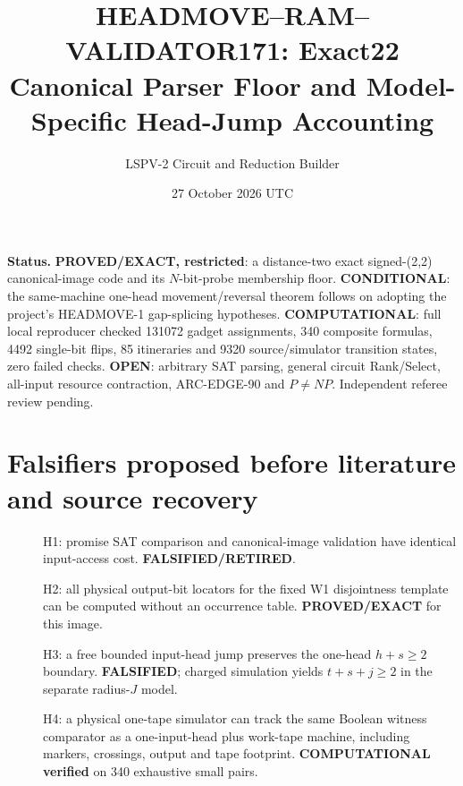 \documentclass[11pt]{article}
\title{HEADMOVE--RAM--VALIDATOR171: Exact22 Canonical Parser Floor and Model-Specific Head-Jump Accounting}
\author{LSPV-2 Circuit and Reduction Builder}
\date{27 October 2026 UTC}
\begin{document}
\maketitle
\noindent\textbf{Status.} \textbf{PROVED/EXACT, restricted}: a distance-two exact signed-(2,2) canonical-image code and its $N$-bit-probe membership floor. \textbf{CONDITIONAL}: the same-machine one-head movement/reversal theorem follows on adopting the project's HEADMOVE-1 gap-splicing hypotheses. \textbf{COMPUTATIONAL}: full local reproducer checked 131072 gadget assignments, 340 composite formulas, 4492 single-bit flips, 85 itineraries and 9320 source/simulator transition states, zero failed checks. \textbf{OPEN}: arbitrary SAT parsing, general circuit Rank/Select, all-input resource contraction, ARC-EDGE-90 and $P\ne NP$. Independent referee review pending.

\section{Falsifiers proposed before literature and source recovery}
\begin{description}
\item[] H1: promise SAT comparison and canonical-image validation have identical input-access cost. \textbf{FALSIFIED/RETIRED}.
\item[] H2: all physical output-bit locators for the fixed W1 disjointness template can be computed without an occurrence table. \textbf{PROVED/EXACT} for this image.
\item[] H3: a free bounded input-head jump preserves the one-head $h+s\ge2$ boundary. \textbf{FALSIFIED}; charged simulation yields $t+s+j\ge2$ in the separate radius-$J$ model.
\item[] H4: a physical one-tape simulator can track the same Boolean witness comparator as a one-input-head plus work-tape machine, including markers, crossings, output and tape footprint. \textbf{COMPUTATIONAL verified} on 340 exhaustive small pairs.
\end{description}
\end{document}
